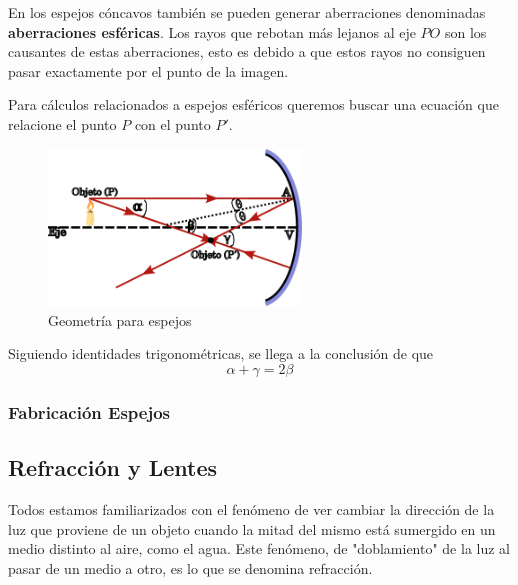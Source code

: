 En los espejos cóncavos también se pueden generar aberraciones denominadas \textbf{aberraciones esféricas}. Los rayos que rebotan más lejanos al eje $PO$ son los causantes de estas aberraciones, esto es debido a que estos rayos no consiguen pasar exactamente por el punto de la imagen.

Para cálculos relacionados a espejos esféricos queremos buscar una ecuación que relacione el punto $P$ con el punto $P'$. 

\begin{figure}[H]
	\centering
	\includegraphics[width=0.6\textwidth]{images/geometria_espejos.png}
	\caption{Geometría para espejos}
	\label{fig:geometria_espejos_imagen}
\end{figure}

Siguiendo identidades trigonométricas, se llega a la conclusión de que 
\begin{equation}
	\alpha + \gamma = 2\beta
\end{equation}

\subsubsection{Fabricación Espejos}


\subsection{Refracción y Lentes}
%

Todos estamos familiarizados con el fenómeno de ver cambiar la dirección de la luz que proviene de un objeto cuando la mitad del mismo está sumergido en un medio distinto al aire, como el agua. Este fenómeno, de "doblamiento" de la luz al pasar de un medio a otro, es lo que se denomina refracción. 

